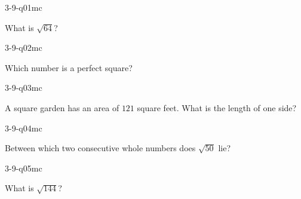 

\begin{practiceQuestion}{3-9-q01}{mc}
\begin{questionText}
What is $\sqrt{64}$?
\end{questionText}
\end{practiceQuestion}

\begin{practiceQuestion}{3-9-q02}{mc}
\begin{questionText}
Which number is a perfect square?
\end{questionText}
\end{practiceQuestion}

\begin{practiceQuestion}{3-9-q03}{mc}
\begin{questionText}
A square garden has an area of $121$ square feet. What is the length of one side?
\end{questionText}
\end{practiceQuestion}

\begin{practiceQuestion}{3-9-q04}{mc}
\begin{questionText}
Between which two consecutive whole numbers does $\sqrt{50}$ lie?
\end{questionText}
\end{practiceQuestion}

\begin{practiceQuestion}{3-9-q05}{mc}
\begin{questionText}
What is $\sqrt{144}$?
\end{questionText}
\end{practiceQuestion}

